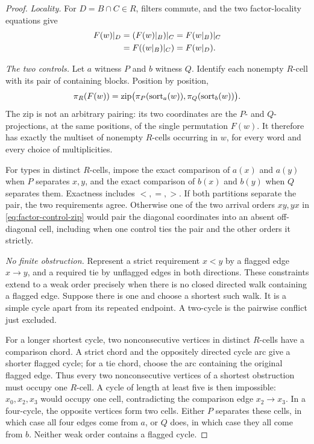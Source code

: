 \begin{proof}
\smallskip\noindent\emph{Locality.}
For \(D=B\cap C\in R\), filters commute, and the two factor-locality equations
give
\begin{equation}
\begin{aligned}
 F(w)\mathord{|}_{D}
 &=(F(w)\mathord{|}_{B})\mathord{|}_{C}
  =F(w\mathord{|}_{B})\mathord{|}_{C}\\
 &=F((w\mathord{|}_{B})\mathord{|}_{C})
  =F(w\mathord{|}_{D}).
\end{aligned}
\label{eq:factor-meet-locality}
\end{equation}

\smallskip\noindent\emph{The two controls.}
Let \(a\) witness \(P\) and \(b\) witness \(Q\).  Identify each nonempty
\(R\)-cell with its pair of containing blocks.  Position by position,
\begin{equation}
 \pi_{R}(F(w))
 =\operatorname{zip}\bigl(
      \pi_{P}(\operatorname{sort}_a(w)),
      \pi_{Q}(\operatorname{sort}_b(w))\bigr).
 \label{eq:factor-control-zip}
\end{equation}
The zip is not an arbitrary pairing: its two coordinates are the \(P\)- and
\(Q\)-projections, at the same positions, of the single permutation \(F(w)\).
It therefore has exactly the multiset of nonempty \(R\)-cells occurring in
\(w\), for every word and every choice of multiplicities.

For types in distinct \(R\)-cells, impose the exact comparison of \(a(x)\) and
\(a(y)\) when \(P\) separates \(x,y\), and the exact comparison of \(b(x)\) and
\(b(y)\) when \(Q\) separates them.  Exactness includes \(<,=,>\).  If both
partitions separate the pair, the two requirements agree.  Otherwise one of
the two arrival orders \(xy,yx\) in \autoref{eq:factor-control-zip} would pair
the diagonal coordinates into an absent off-diagonal cell, including when one
control ties the pair and the other orders it strictly.

\smallskip\noindent\emph{No finite obstruction.}
Represent a strict requirement \(x<y\) by a flagged edge \(x\to y\), and a
required tie by unflagged edges in both directions.  These constraints extend
to a weak order precisely when there is no closed directed walk containing a
flagged edge.  Suppose there is one and choose a shortest such walk.  It is a
simple cycle apart from its repeated endpoint.  A two-cycle is the pairwise
conflict just excluded.

For a longer shortest cycle, two nonconsecutive vertices in distinct
\(R\)-cells have a comparison chord.  A strict chord and the oppositely
directed cycle arc give a shorter flagged cycle; for a tie chord, choose the
arc containing the original flagged edge.  Thus every two nonconsecutive
vertices of a shortest obstruction must occupy one \(R\)-cell.  A cycle of
length at least five is then impossible: \(x_0,x_2,x_3\) would occupy one
cell, contradicting the comparison edge \(x_2\to x_3\).  In a four-cycle,
the opposite vertices form two cells.  Either \(P\) separates these cells, in
which case all four edges come from \(a\), or \(Q\) does, in which case they
all come from \(b\).  Neither weak order contains a flagged cycle.


\end{proof}
